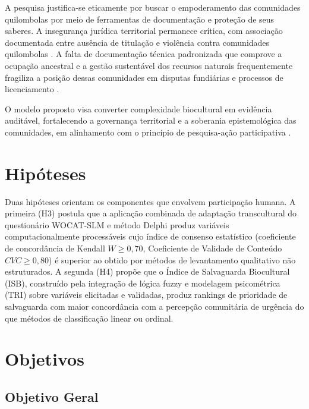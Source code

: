 \documentclass[12pt,a4paper,brazil]{article}
\begin{document}
A pesquisa justifica-se eticamente por buscar o empoderamento das comunidades quilombolas por meio de ferramentas de documentação e proteção de seus saberes. A insegurança jurídica territorial permanece crítica, com associação documentada entre ausência de titulação e violência contra comunidades quilombolas \citep{conaq2023racismo}. A falta de documentação técnica padronizada que comprove a ocupação ancestral e a gestão sustentável dos recursos naturais frequentemente fragiliza a posição dessas comunidades em disputas fundiárias e processos de licenciamento \citep{Santilli2009}.

O modelo proposto visa converter complexidade biocultural em evidência auditável, fortalecendo a governança territorial e a soberania epistemológica das comunidades, em alinhamento com o princípio de pesquisa-ação participativa \citep{FalsBorda1991}.


\section{Hipóteses}

Duas hipóteses orientam os componentes que envolvem participação humana. A primeira (H3) postula que a aplicação combinada de adaptação transcultural do questionário WOCAT-SLM e método Delphi produz variáveis computacionalmente processáveis cujo índice de consenso estatístico (coeficiente de concordância de Kendall $W \geq 0{,}70$, Coeficiente de Validade de Conteúdo $CVC \geq 0{,}80$) é superior ao obtido por métodos de levantamento qualitativo não estruturados. A segunda (H4) propõe que o Índice de Salvaguarda Biocultural (ISB), construído pela integração de lógica fuzzy e modelagem psicométrica (TRI) sobre variáveis elicitadas e validadas, produz rankings de prioridade de salvaguarda com maior concordância com a percepção comunitária de urgência do que métodos de classificação linear ou ordinal.


\section{Objetivos}

\subsection{Objetivo Geral}
\end{document}
